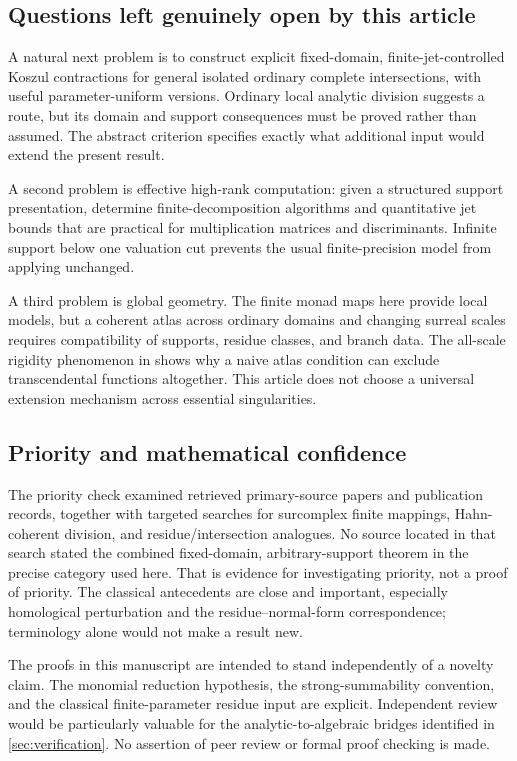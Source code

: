 \documentclass[11pt,letterpaper]{article}
\theoremstyle{definition}
\theoremstyle{remark}
\numberwithin{equation}{section}
\begin{document}
\subsection{Questions left genuinely open by this article}
A natural next problem is to construct explicit fixed-domain, finite-jet-controlled Koszul contractions for general isolated ordinary complete intersections, with useful parameter-uniform versions. Ordinary local analytic division suggests a route, but its domain and support consequences must be proved rather than assumed. The abstract criterion specifies exactly what additional input would extend the present result.

A second problem is effective high-rank computation: given a structured support presentation, determine finite-decomposition algorithms and quantitative jet bounds that are practical for multiplication matrices and discriminants. Infinite support below one valuation cut prevents the usual finite-precision model from applying unchanged.

A third problem is global geometry. The finite monad maps here provide local models, but a coherent atlas across ordinary domains and changing surreal scales requires compatibility of supports, residue classes, and branch data. The all-scale rigidity phenomenon in \cite{Supplied} shows why a naive atlas condition can exclude transcendental functions altogether. This article does not choose a universal extension mechanism across essential singularities.

\subsection{Priority and mathematical confidence}
The priority check examined retrieved primary-source papers and publication records, together with targeted searches for surcomplex finite mappings, Hahn-coherent division, and residue/intersection analogues. No source located in that search stated the combined fixed-domain, arbitrary-support theorem in the precise category used here. That is evidence for investigating priority, not a proof of priority. The classical antecedents are close and important, especially homological perturbation and the residue--normal-form correspondence; terminology alone would not make a result new.

The proofs in this manuscript are intended to stand independently of a novelty claim. The monomial reduction hypothesis, the strong-summability convention, and the classical finite-parameter residue input are explicit. Independent review would be particularly valuable for the analytic-to-algebraic bridges identified in \cref{sec:verification}. No assertion of peer review or formal proof checking is made.
\end{document}
